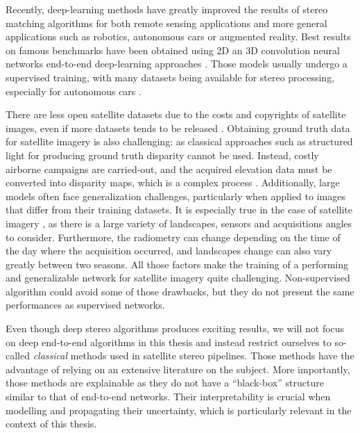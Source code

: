 Recently, deep-learning methods have greatly improved the results of stereo matching algorithms for both remote sensing applications \cite{chebbi_deepsim-nets_2023} and more general applications \cite{tosi_survey_2024} such as robotics, autonomous cars or augmented reality. Best results on famous benchmarks have been obtained using 2D an 3D convolution neural networks end-to-end deep-learning approaches \cite{guo_openstereo_2024, liu_playing_2024}. Those models usually undergo a supervised training, with many datasets being available for stereo processing, especially for autonomous cars \cite{geiger_are_2012, geiger_vision_2013}.

There are less open satellite datasets due to the costs and copyrights of satellite images, even if more datasets tends to be released \cite{bosch_semantic_2018, le_saux_data_2019, huang_urban_2022}. Obtaining ground truth data for satellite imagery is also challenging: as classical approaches such as structured light for producing ground truth disparity cannot be used. Instead, costly airborne campaigns are carried-out, and the acquired elevation data must be converted into disparity maps, which is a complex process \cite{cournet_ground_2020}. Additionally, large models often face generalization challenges, particularly when applied to images that differ from their training datasets. It is especially true in the case of satellite imagery \cite{mari_disparity_2022, jiang_rethinking_2024}, as there is a large variety of landscapes, sensors and acquisitions angles to consider. Furthermore, the radiometry can change depending on the time of the day where the acquisition occurred, and landscapes change can also vary greatly between two seasons. All those factors make the training of a performing and generalizable network for satellite imagery quite challenging. Non-supervised algorithm could avoid some of those drawbacks, but they do not present the same performances as supervised networks.

Even though deep stereo algorithms produces exciting results, we will not focus on deep end-to-end algorithms in this thesis and instead restrict ourselves to so-called \textit{classical} methods used in satellite stereo pipelines. Those methods have the advantage of relying on an extensive literature on the subject. More importantly, those methods are explainable as they do not have a ``black-box'' structure similar to that of end-to-end networks. Their interpretability is crucial when modelling and propagating their uncertainty, which is particularly relevant in the context of this thesis.

